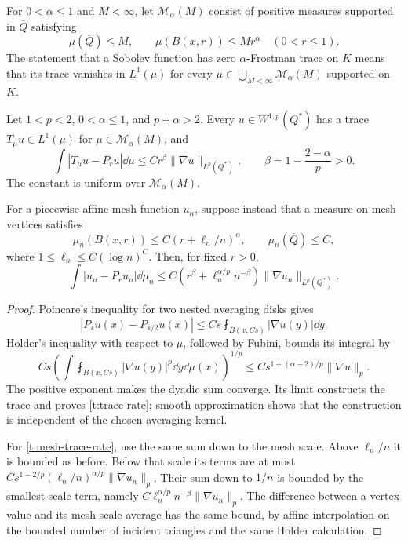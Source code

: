 \begin{definition}\label{t:frostman-definition}
For $0<\alpha\le1$ and $M<\infty$, let $\mathcal M_\alpha(M)$ consist of
positive measures supported in $\overline Q$ satisfying
\[
 \mu(\overline Q)\le M,\qquad
 \mu(B(x,r))\le Mr^\alpha\quad(0<r\le1).
\]
The statement that a Sobolev function has zero $\alpha$-Frostman trace on
$K$ means that its trace vanishes in $L^1(\mu)$ for every
$\mu\in\bigcup_{M<\infty}\mathcal M_\alpha(M)$ supported on $K$.
\end{definition}

\begin{lemma}\label{t:frostman}
Let $1<p<2$, $0<\alpha\le1$, and $p+\alpha>2$.  Every
$u\in W^{1,p}(Q^*)$ has a trace $T_\mu u\in L^1(\mu)$ for
$\mu\in\mathcal M_\alpha(M)$, and
\begin{equation}\label{t:trace-rate}
 \int|T_\mu u-P_ru|\dd\mu
 \le C r^\beta\|\nabla u\|_{L^p(Q^*)},\qquad
 \beta=1-\frac{2-\alpha}{p}>0.
\end{equation}
The constant is uniform over $\mathcal M_\alpha(M)$.

For a piecewise affine mesh function $u_n$, suppose instead that a measure
on mesh vertices satisfies
\begin{equation}\label{t:coarse-frostman}
 \mu_n(B(x,r))\le C(r+\ell_n/n)^\alpha,
 \qquad \mu_n(\overline Q)\le C,
\end{equation}
where $1\le\ell_n\le C(\log n)^C$.  Then, for fixed $r>0$,
\begin{equation}\label{t:mesh-trace-rate}
 \int|u_n-P_ru_n|\dd\mu_n
 \le C\left(r^\beta+
       \ell_n^{\alpha/p}n^{-\beta}\right)
       \|\nabla u_n\|_{L^p(Q^*)}.
\end{equation}
\end{lemma}
\begin{proof}
Poincare's inequality for two nested averaging disks gives
\[
 |P_su(x)-P_{s/2}u(x)|
 \le Cs\fint_{B(x,Cs)}|\nabla u(y)|\dd y.
\]
Holder's inequality with respect to $\mu$, followed by Fubini, bounds its
integral by
\[
 Cs\left(\int\fint_{B(x,Cs)}|\nabla u(y)|^p\dd y\dd\mu(x)\right)^{1/p}
 \le Cs^{1+(\alpha-2)/p}\|\nabla u\|_p.
\]
The positive exponent makes the dyadic sum converge.  Its limit constructs
the trace and proves \eqref{t:trace-rate}; smooth approximation shows that
the construction is independent of the chosen averaging kernel.

For \eqref{t:mesh-trace-rate}, use the same sum down to the mesh scale.
Above $\ell_n/n$ it is bounded as before.  Below that scale its terms are
at most
$Cs^{1-2/p}(\ell_n/n)^{\alpha/p}\|\nabla u_n\|_p$.
Their sum down to $1/n$ is bounded by the smallest-scale term, namely
$C\ell_n^{\alpha/p}n^{-\beta}\|\nabla u_n\|_p$.
The difference between a vertex value and its mesh-scale average has the
same bound, by affine interpolation on the bounded number of incident
triangles and the same Holder calculation.
\end{proof}

